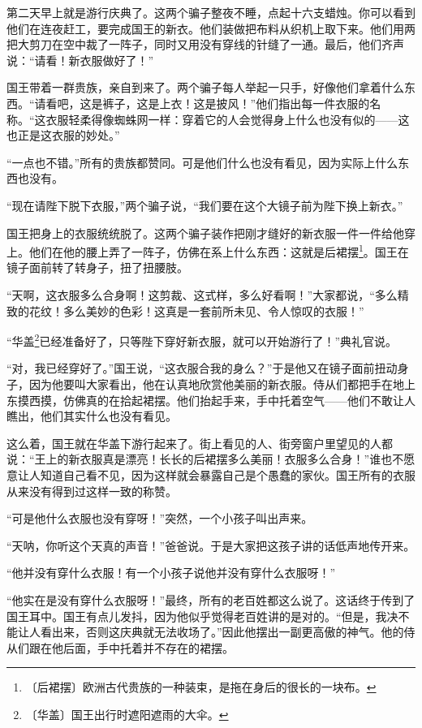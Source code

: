 \documentclass[12pt,UTF-8,openany]{ctexbook}
\begin{document}
\begin{large}
    第二天早上就是游行庆典了。这两个骗子整夜不睡，点起十六支蜡烛。你可以看到他们在连夜赶工，要完成国王的新衣。他们装做把布料从织机上取下来。他们用两把大剪刀在空中裁了一阵子，同时又用没有穿线的针缝了一通。最后，他们齐声说：“请看！新衣服做好了！”
    
    国王带着一群贵族，亲自到来了。两个骗子每人举起一只手，好像他们拿着什么东西。“请看吧，这是裤子，这是上衣！这是披风！”他们指出每一件衣服的名称。“这衣服轻柔得像蜘蛛网一样：穿着它的人会觉得身上什么也没有似的——这也正是这衣服的妙处。”
    
    “一点也不错。”所有的贵族都赞同。可是他们什么也没有看见，因为实际上什么东西也没有。
    
    “现在请陛下脱下衣服，”两个骗子说，“我们要在这个大镜子前为陛下换上新衣。”
    
    国王把身上的衣服统统脱了。这两个骗子装作把刚才缝好的新衣服一件一件给他穿上。他们在他的腰上弄了一阵子，仿佛在系上什么东西：这就是后裙摆\footnote{〔后裙摆〕欧洲古代贵族的一种装束，是拖在身后的很长的一块布。}。国王在镜子面前转了转身子，扭了扭腰肢。
    
    “天啊，这衣服多么合身啊！这剪裁、这式样，多么好看啊！”大家都说，“多么精致的花纹！多么美妙的色彩！这真是一套前所未见、令人惊叹的衣服！”
    
    “华盖\footnote{〔华盖〕国王出行时遮阳遮雨的大伞。}已经准备好了，只等陛下穿好新衣服，就可以开始游行了！”典礼官说。
    
    “对，我已经穿好了。”国王说，“这衣服合我的身么？”于是他又在镜子面前扭动身子，因为他要叫大家看出，他在认真地欣赏他美丽的新衣服。侍从们都把手在地上东摸西摸，仿佛真的在拾起裙摆。他们抬起手来，手中托着空气——他们不敢让人瞧出，他们其实什么也没有看见。
    
    这么着，国王就在华盖下游行起来了。街上看见的人、街旁窗户里望见的人都说：“王上的新衣服真是漂亮！长长的后裙摆多么美丽！衣服多么合身！”谁也不愿意让人知道自己看不见，因为这样就会暴露自己是个愚蠢的家伙。国王所有的衣服从来没有得到过这样一致的称赞。
    
    “可是他什么衣服也没有穿呀！”突然，一个小孩子叫出声来。
    
    “天呐，你听这个天真的声音！”爸爸说。于是大家把这孩子讲的话低声地传开来。
    
    “他并没有穿什么衣服！有一个小孩子说他并没有穿什么衣服呀！”
    
    “他实在是没有穿什么衣服呀！”最终，所有的老百姓都这么说了。这话终于传到了国王耳中。国王有点儿发抖，因为他似乎觉得老百姓讲的是对的。“但是，我决不能让人看出来，否则这庆典就无法收场了。”因此他摆出一副更高傲的神气。他的侍从们跟在他后面，手中托着并不存在的裙摆。
    
\end{large}
\end{document}

